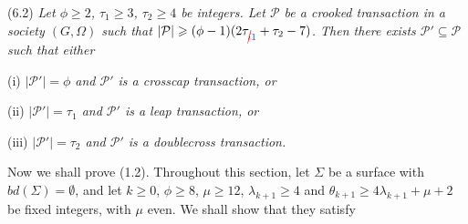 \stmt
(6.2) \textit{Let $\phi \ge 2$, $\tau_1 \ge 3$, $\tau_2 \ge 4$ be integers. Let $\mathcal{P}$ be a crooked transaction in a society $(G, \Omega)$ such that $|\mathcal{P}| \ge (\phi - 1)(2\tau_{\delm{i}\fix{1}} + \tau_2 - 7)$. Then there exists $\mathcal{P}' \subseteq \mathcal{P}$ such that either}

\hspace*{12pt}(i) \textit{$|\mathcal{P}'| = \phi$ and $\mathcal{P}'$ is a crosscap transaction, or}

\hspace*{12pt}(ii) \textit{$|\mathcal{P}'| = \tau_1$ and $\mathcal{P}'$ is a leap transaction, or}

\hspace*{12pt}(iii) \textit{$|\mathcal{P}'| = \tau_2$ and $\mathcal{P}'$ is a doublecross transaction.}


Now we shall prove (1.2). Throughout this section, let $\Sigma$ be a surface with $bd(\Sigma) = \emptyset$, and let $k \ge 0$, $\phi \ge 8$, $\mu \ge 12$, $\lambda_{k+1} \ge 4$ and $\theta_{k+1} \ge 4\lambda_{k+1} + \mu + 2$ be fixed integers, with $\mu$ even. We shall show that they satisfy
